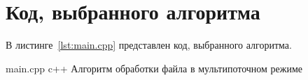 \chapter{Код, выбранного алгоритма}

В листинге~\ref{lst:main.cpp} представлен код, выбранного алгоритма.

	{main.cpp}
	{c++}
	{Алгоритм обработки файла в мультипоточном режиме}
